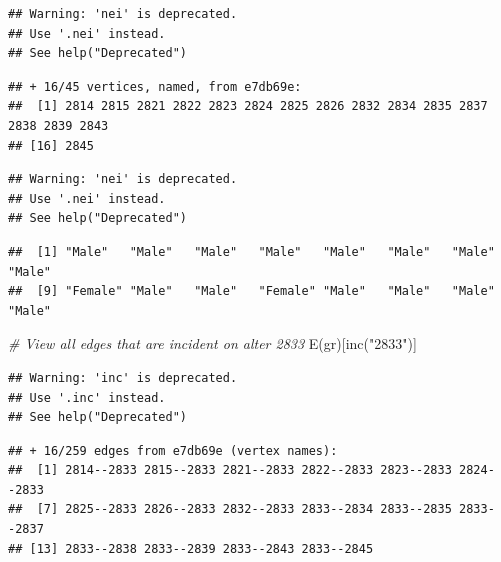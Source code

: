 \documentclass[
]{book}
\newenvironment{Shaded}{\begin{snugshade}}{\end{snugshade}}
\newcommand{\CommentTok}[1]{\textcolor[rgb]{0.56,0.35,0.01}{\textit{#1}}}
\newcommand{\FunctionTok}[1]{\textcolor[rgb]{0.00,0.00,0.00}{#1}}
\newcommand{\NormalTok}[1]{#1}
\newcommand{\SpecialCharTok}[1]{\textcolor[rgb]{0.00,0.00,0.00}{#1}}
\newcommand{\StringTok}[1]{\textcolor[rgb]{0.31,0.60,0.02}{#1}}
\begin{document}
\begin{verbatim}
## Warning: 'nei' is deprecated.
## Use '.nei' instead.
## See help("Deprecated")
\end{verbatim}

\begin{verbatim}
## + 16/45 vertices, named, from e7db69e:
##  [1] 2814 2815 2821 2822 2823 2824 2825 2826 2832 2834 2835 2837 2838 2839 2843
## [16] 2845
\end{verbatim}

\begin{Shaded}
\end{Shaded}

\begin{verbatim}
## Warning: 'nei' is deprecated.
## Use '.nei' instead.
## See help("Deprecated")
\end{verbatim}

\begin{verbatim}
##  [1] "Male"   "Male"   "Male"   "Male"   "Male"   "Male"   "Male"   "Male"  
##  [9] "Female" "Male"   "Male"   "Female" "Male"   "Male"   "Male"   "Male"
\end{verbatim}

\begin{Shaded}
\begin{Highlighting}[]
\CommentTok{\# View all edges that are incident on alter 2833}
\FunctionTok{E}\NormalTok{(gr)[}\FunctionTok{inc}\NormalTok{(}\StringTok{"2833"}\NormalTok{)]}
\end{Highlighting}
\end{Shaded}

\begin{verbatim}
## Warning: 'inc' is deprecated.
## Use '.inc' instead.
## See help("Deprecated")
\end{verbatim}

\begin{verbatim}
## + 16/259 edges from e7db69e (vertex names):
##  [1] 2814--2833 2815--2833 2821--2833 2822--2833 2823--2833 2824--2833
##  [7] 2825--2833 2826--2833 2832--2833 2833--2834 2833--2835 2833--2837
## [13] 2833--2838 2833--2839 2833--2843 2833--2845
\end{verbatim}
\end{document}
